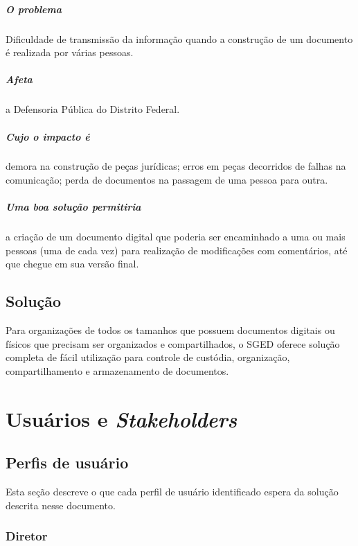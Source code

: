 \documentclass[12pt,a4paper]{report}
\begin{document}
\paragraph{O problema} Dificuldade de transmissão da informação quando a construção de um documento é realizada por várias pessoas.
\paragraph{Afeta} a Defensoria Pública do Distrito Federal.
\paragraph{Cujo o impacto é} demora na construção de peças jurídicas; erros em peças decorridos de falhas na comunicação; perda de documentos na passagem de uma pessoa para outra.
\paragraph{Uma boa solução permitiria} a criação de um documento digital que poderia ser encaminhado a uma ou mais pessoas (uma de cada vez) para realização de modificações com comentários, até que chegue em sua versão final.

\section{Solução}

Para organizações de todos os tamanhos que possuem documentos digitais ou físicos que precisam ser organizados e compartilhados, o SGED oferece solução completa de fácil utilização para controle de custódia, organização, compartilhamento e armazenamento de documentos.

\chapter{Usuários e \textit{Stakeholders}}

\section{Perfis de usuário}

Esta seção descreve o que cada perfil de usuário identificado espera da solução descrita nesse documento.

\subsection{Diretor}
\end{document}
